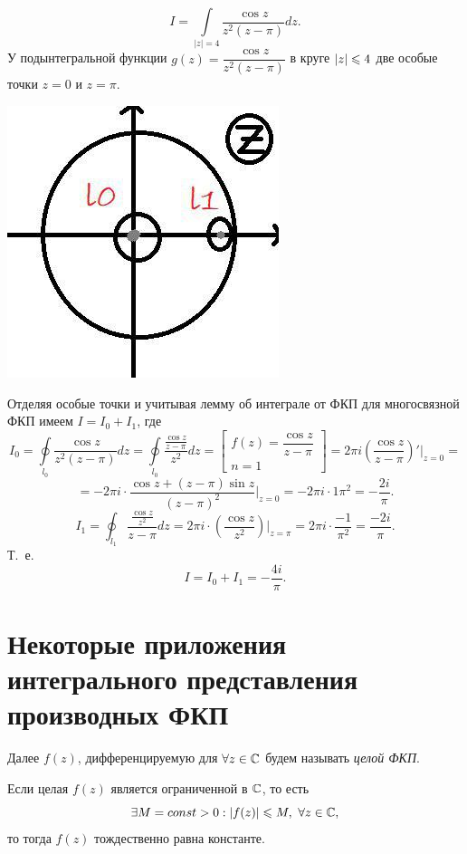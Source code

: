 \documentclass[../../main.tex]{subfiles}
\begin{document}
\begin{exmp}
	\[
	I = \int\limits_{|z|=4}\frac{\cos z}{z^2 (z-\pi)}
	dz.
	\]
	У подынтегральной функции $g(z)=\dfrac{\cos z}
	{z^2(z-\pi)}$ в круге $\left|{z}\right| \leqslant 4$
	две особые точки $z=0$ и $z=\pi$.
	
	\begin{center}
	\includegraphics{lec33_1}
	\end{center}
	
	Отделяя особые точки и учитывая лемму об 
	интеграле от ФКП для многосвязной ФКП имеем 
	$I = I_0 + I_1$, где 
	\[
	I_0 = 
	\oint\limits_{l_0}\dfrac{\cos z}{z^2(z - \pi)} 
	dz=
	\oint\limits_{l_0}\dfrac{\frac{\cos z}
		{z-\pi}}{z^2} dz
	= \left[
	\begin{array}{l}
	f(z) = \dfrac{\cos z}{z-\pi} \\
	n = 1
	\end{array}
	\right] = 
	2\pi i \left( \dfrac{\cos z}{z-\pi}\right)'
	\bigg|_{z=0}=
	\]
	\[= -2\pi i \cdot \dfrac{\cos z + 
		(z - \pi) \sin z}{(z-\pi)^2}\bigg|_{z=0}=
	-2\pi i \cdot {1}{\pi ^2} = -\dfrac{2i}{\pi}.
	\]
	\[
	I_1 = \oint_{l_1} \dfrac{\frac{\cos z}{z^2}}
	{z-\pi} dz = 2 \pi i \cdot \left(
	\dfrac{\cos z}{z^2}
	\right) |_{z=\pi} = 2\pi i \cdot \dfrac{-1}{\pi^2}
	=\dfrac{-2i}{\pi}.
	\]
	Т.~е.
	\[
	I = I_0 + I_1 = -\dfrac{4i}{\pi}.
	\]
\end{exmp}

\section{Некоторые приложения интегрального
	представления производных ФКП}

Далее $f(z)$, дифференцируемую для $\forall z \in \mathbb{C}$
будем называть \emph{целой ФКП}.
\begin{thm}[Лиувилль]
	Если целая $f(z)$ является ограниченной в $\mathbb{C}$,
	то есть
	\begin{equation}
	\label{lec33:11}
	\exists M = const > 0 : \left|{f(z)}\right|
	\leqslant M,\ \forall z \in \mathbb{C}, 
	\end{equation}
	то тогда $f(z)$ тождественно равна константе.
\end{thm}
	
\end{document}
